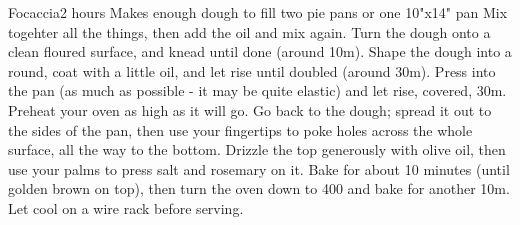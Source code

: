 \begin{recipe}{Focaccia}{}{2 hours}
\freeform Makes enough dough to fill two pie pans or one 10"x14" pan
Mix togehter all the things, then add the oil and mix again. Turn the dough onto a clean floured surface, and knead until done (around 10m).
\ing[]{}{}
Shape the dough into a round, coat with a little oil, and let rise until doubled (around 30m). Press into the pan (as much as possible - it may be quite elastic) and let rise, covered, 30m.
 Preheat your oven as high as it will go. Go back to the dough; spread it out to the sides of the pan, then use your fingertips to poke holes across the whole surface, all the way to the bottom. Drizzle the top generously with olive oil, then use your palms to press salt and rosemary on it. Bake for about 10 minutes (until golden brown on top), then turn the oven down to 400 and bake for another 10m. 
\freeform Let cool on a wire rack before serving.

\end{recipe}
